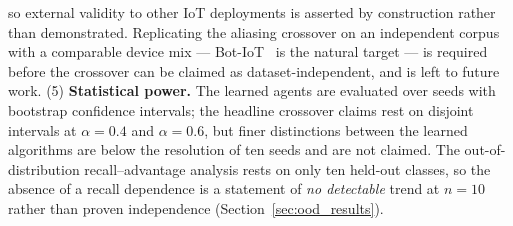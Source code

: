 so external validity to other IoT deployments is asserted by construction rather than demonstrated. Replicating the aliasing crossover on an independent corpus with a comparable device mix --- Bot-IoT~\cite{Koroniotis2019} is the natural target --- is required before the crossover can be claimed as dataset-independent, and is left to future work. (5) \textbf{Statistical power.} The learned agents are evaluated over \NumSeeds{} seeds with bootstrap confidence intervals; the headline crossover claims rest on disjoint intervals at $\alpha = 0.4$ and $\alpha = 0.6$, but finer distinctions between the learned algorithms are below the resolution of ten seeds and are not claimed. The out-of-distribution recall--advantage analysis rests on only ten held-out classes, so the absence of a recall dependence is a statement of \emph{no detectable} trend at $n=10$ rather than proven independence (Section~\ref{sec:ood_results}).
